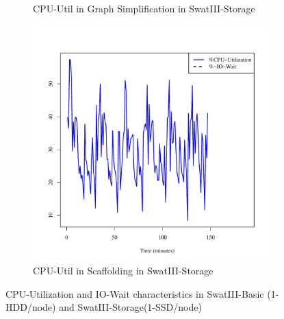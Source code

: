 \documentclass[conference]{IEEEtran}
\begin{document}
\begin{figure}[]
\begin{subfigure}[b]{0.25\textwidth}
                \caption{CPU-Util in Graph Simplification in SwatIII-Storage}
                \label{fig:ECCPUSSD}
        \end{subfigure}
        \begin{subfigure}[b]{0.25\textwidth}
                \includegraphics[width=\textwidth]{Figure/SystemData/Plots/SCFCPUSSD.pdf}
                \caption{CPU-Util in Scaffolding in SwatIII-Storage}
                \label{fig:SCFCPUSSD}
        \end{subfigure}
        \caption{CPU-Utilization and IO-Wait characteristics in SwatIII-Basic (1-HDD/node) and SwatIII-Storage(1-SSD/node)}\label{fig:HddSsdCPU}
\end{figure}
\end{document}
